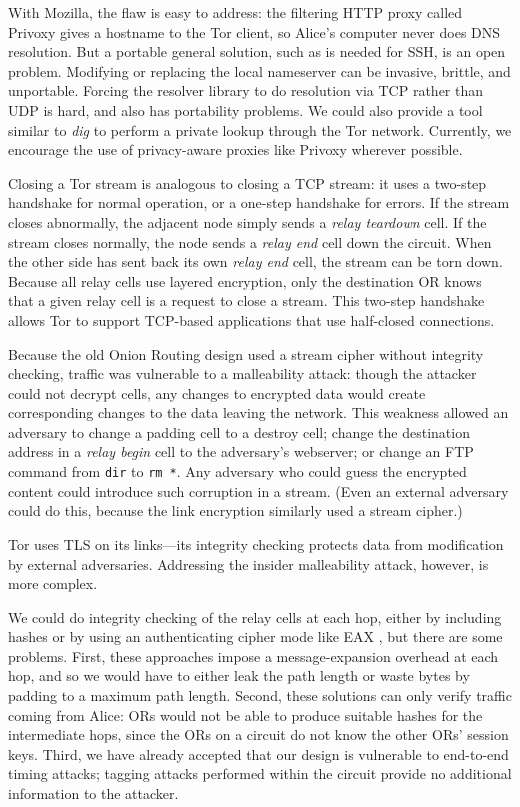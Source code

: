 \documentclass[times,10pt,twocolumn]{article}
\begin{document}
With Mozilla, the flaw is easy to address: the filtering HTTP
proxy called Privoxy gives a hostname to the Tor client, so Alice's
computer never does DNS resolution.
But a portable general solution, such as is needed for
SSH, is
an open problem. Modifying or replacing the local nameserver
can be invasive, brittle, and unportable. Forcing the resolver
library to do resolution via TCP rather than UDP is
hard, and also has portability problems. We could also provide a
tool similar to \emph{dig} to perform a private lookup through the
Tor network. Currently, we encourage the use of
privacy-aware proxies like Privoxy wherever possible.

Closing a Tor stream is analogous to closing a TCP stream: it uses a
two-step handshake for normal operation, or a one-step handshake for
errors. If the stream closes abnormally, the adjacent node simply sends a
\emph{relay teardown} cell. If the stream closes normally, the node sends
a \emph{relay end} cell down the circuit. When the other side has sent
back its own \emph{relay end} cell, the stream can be torn down.  Because
all relay cells use layered encryption, only the destination OR knows
that a given relay cell is a request to close a stream.  This two-step
handshake allows Tor to support TCP-based applications that use half-closed
connections.

\label{subsec:integrity-checking}

Because the old Onion Routing design used a stream cipher without integrity
checking, traffic was
vulnerable to a malleability attack: though the attacker could not
decrypt cells, any changes to encrypted data
would create corresponding changes to the data leaving the network.
This weakness allowed an adversary to change a padding cell to a destroy
cell; change the destination address in a \emph{relay begin} cell to the
adversary's webserver; or change an FTP command from
{\tt dir} to {\tt rm~*}. Any adversary who could guess the encrypted
content could introduce such corruption in a stream. (Even an external
adversary could do this, because the link encryption similarly used a
stream cipher.)

Tor uses TLS on its links---its integrity checking
protects data from modification by external adversaries.
Addressing the insider malleability attack, however, is
more complex.

We could do integrity checking of the relay cells at each hop, either
by including hashes or by using an authenticating cipher mode like
EAX \cite{eax}, but there are some problems. First, these approaches
impose a message-expansion overhead at each hop, and so we would have to
either leak the path length or waste bytes by padding to a maximum
path length. Second, these solutions can only verify traffic coming
from Alice: ORs would not be able to produce suitable hashes for
the intermediate hops, since the ORs on a circuit do not know the
other ORs' session keys. Third, we have already accepted that our design
is vulnerable to end-to-end timing attacks; tagging attacks performed
within the circuit provide no additional information to the attacker.
\end{document}
